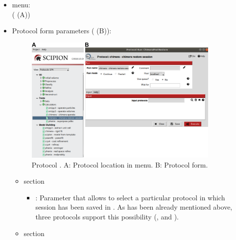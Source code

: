  \begin{itemize}
  \item \scipion menu:\\
    ( (A))\\
  
  \item Protocol form parameters ( (B)):\\
  
    \begin{figure}[H]
     \centering 
     \captionsetup{width=.7\linewidth} 
     \includegraphics[width=0.90\textwidth]{Images_appendix/Fig118.pdf}
     \caption{Protocol . A: Protocol location in \scipion menu. B: Protocol form.}
     \label{fig:app_protocol_chimera_3}
    \end{figure}
    
    \begin{itemize}
     \item {} section\\

    \begin{itemize}
     \item {}: Parameter that allows to select a particular protocol in which \chimera session has been saved in \scipion. As has been already mentioned above, three protocols support this possibility (\chimera {}, \chimera {} and \scipion {}).\\
     
    \end{itemize}
    \item {} section\\
    

\end{itemize}
\end{itemize}
